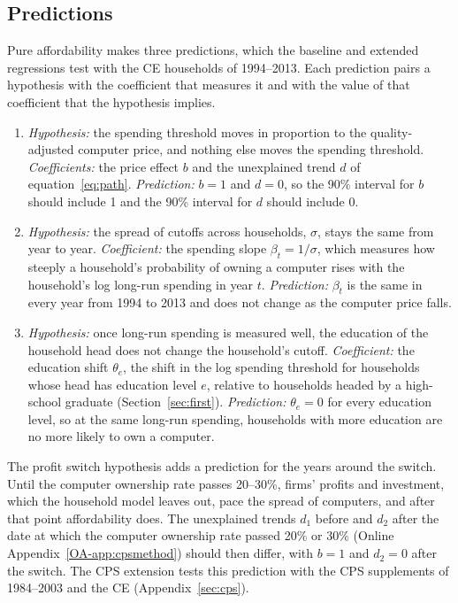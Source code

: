 \documentclass[11pt]{article}
\begin{document}
\subsection{Predictions}

Pure affordability makes three predictions, which the baseline and extended regressions test with the CE households of 1994--2013. Each prediction pairs a hypothesis with the coefficient that measures it and with the value of that coefficient that the hypothesis implies.
\begin{enumerate}
\item \emph{Hypothesis:} the spending threshold moves in proportion to the quality-adjusted computer price, and nothing else moves the spending threshold. \emph{Coefficients:} the price effect $b$ and the unexplained trend $d$ of equation~\eqref{eq:path}. \emph{Prediction:} $b = 1$ and $d = 0$, so the 90\% interval for $b$ should include 1 and the 90\% interval for $d$ should include 0.
\item \emph{Hypothesis:} the spread of cutoffs across households, $\sigma$, stays the same from year to year. \emph{Coefficient:} the spending slope $\beta_t = 1/\sigma$, which measures how steeply a household's probability of owning a computer rises with the household's log long-run spending in year $t$. \emph{Prediction:} $\beta_t$ is the same in every year from 1994 to 2013 and does not change as the computer price falls.
\item \emph{Hypothesis:} once long-run spending is measured well, the education of the household head does not change the household's cutoff. \emph{Coefficient:} the education shift $\theta_e$, the shift in the log spending threshold for households whose head has education level $e$, relative to households headed by a high-school graduate (Section~\ref{sec:first}). \emph{Prediction:} $\theta_e = 0$ for every education level, so at the same long-run spending, households with more education are no more likely to own a computer.
\end{enumerate}
The profit switch hypothesis adds a prediction for the years around the switch. Until the computer ownership rate passes 20--30\%, firms' profits and investment, which the household model leaves out, pace the spread of computers, and after that point affordability does. The unexplained trends $d_1$ before and $d_2$ after the date at which the computer ownership rate passed 20\% or 30\% (Online Appendix~\ref{OA-app:cpsmethod}) should then differ, with $b = 1$ and $d_2 = 0$ after the switch. The CPS extension tests this prediction with the CPS supplements of 1984--2003 and the CE (Appendix~\ref{sec:cps}).
\end{document}
